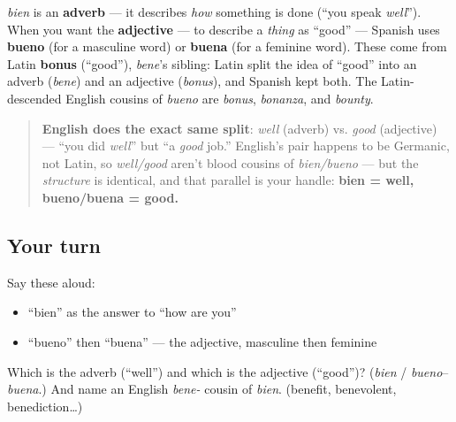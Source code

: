 \begin{grammarlens}[title={The adjective sibling: \emph{bueno} / \emph{buena}}]
\emph{bien} is an \textbf{adverb} — it describes \emph{how} something is done (\textquotedblleft{}you speak \emph{well}\textquotedblright{}). When you want the \textbf{adjective} — to describe a \emph{thing} as \textquotedblleft{}good\textquotedblright{} — Spanish uses \textbf{bueno} (for a masculine word) or \textbf{buena} (for a feminine word). These come from Latin \textbf{bonus} (\textquotedblleft{}good\textquotedblright{}), \emph{bene}'s sibling: Latin split the idea of \textquotedblleft{}good\textquotedblright{} into an adverb (\emph{bene}) and an adjective (\emph{bonus}), and Spanish kept both. The Latin-descended English cousins of \emph{bueno} are \emph{bonus}, \emph{bonanza}, and \emph{bounty}.

\begin{quote}
\textbf{English does the exact same split}: \emph{well} (adverb) vs. \emph{good} (adjective) — \textquotedblleft{}you did \emph{well}\textquotedblright{} but \textquotedblleft{}a \emph{good} job.\textquotedblright{} English's pair happens to be Germanic, not Latin, so \emph{well/good} aren't blood cousins of \emph{bien/bueno} — but the \emph{structure} is identical, and that parallel is your handle: \textbf{bien = well, bueno/buena = good.}
\end{quote}
\end{grammarlens}

\subsection*{Your turn}
Say these aloud:

\begin{itemize}
\raggedright
  \item \textquotedblleft{}bien\textquotedblright{} as the answer to \textquotedblleft{}how are you\textquotedblright{}
  \item \textquotedblleft{}bueno\textquotedblright{} then \textquotedblleft{}buena\textquotedblright{} — the adjective, masculine then feminine
\end{itemize}

\begin{tcolorbox}[breakable,colback=teal!4,colframe=teal!35!black,title={Before you move on}]
Which is the adverb (\textquotedblleft{}well\textquotedblright{}) and which is the adjective (\textquotedblleft{}good\textquotedblright{})? (\emph{bien} / \emph{bueno}–\emph{buena}.) And name an English \emph{bene-} cousin of \emph{bien}. (benefit, benevolent, benediction…)
\end{tcolorbox}
